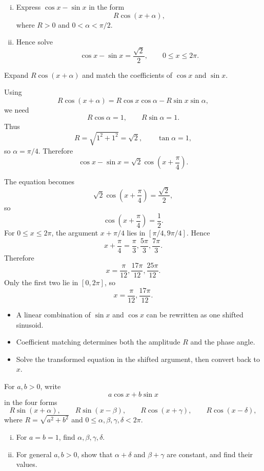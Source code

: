 \begin{problem}
\begin{enumerate}[(i)]
  \item Express $\cos x-\sin x$ in the form
        \[
        R\cos(x+\alpha),
        \]
        where $R>0$ and $0<\alpha<\pi/2$.
  \item Hence solve
        \[
        \cos x-\sin x=\frac{\sqrt2}{2},
        \qquad 0\le x\le2\pi.
        \]
\end{enumerate}
\end{problem}

\begin{hintbox}
Expand $R\cos(x+\alpha)$ and match the coefficients of $\cos x$ and $\sin x$.
\end{hintbox}

\begin{solution}
Using
\[
R\cos(x+\alpha)=R\cos x\cos\alpha-R\sin x\sin\alpha,
\]
we need
\[
R\cos\alpha=1,
\qquad
R\sin\alpha=1.
\]
Thus
\[
R=\sqrt{1^2+1^2}=\sqrt2,
\qquad
\tan\alpha=1,
\]
so $\alpha=\pi/4$. Therefore
\[
\cos x-\sin x=\sqrt2\cos\left(x+\frac{\pi}{4}\right).
\]

The equation becomes
\[
\sqrt2\cos\left(x+\frac{\pi}{4}\right)=\frac{\sqrt2}{2},
\]
so
\[
\cos\left(x+\frac{\pi}{4}\right)=\frac12.
\]
For $0\le x\le2\pi$, the argument $x+\pi/4$ lies in
$[\pi/4,9\pi/4]$. Hence
\[
x+\frac{\pi}{4}=\frac{\pi}{3},\frac{5\pi}{3},\frac{7\pi}{3}.
\]
Therefore
\[
x=\frac{\pi}{12},\frac{17\pi}{12},\frac{25\pi}{12}.
\]
Only the first two lie in $[0,2\pi]$, so
\[
\boxed{x=\frac{\pi}{12},\frac{17\pi}{12}}.
\]
\end{solution}

\begin{takeaways}
\begin{itemize}[leftmargin=*]
  \item A linear combination of $\sin x$ and $\cos x$ can be rewritten as one
        shifted sinusoid.
  \item Coefficient matching determines both the amplitude $R$ and the phase
        angle.
  \item Solve the transformed equation in the shifted argument, then convert
        back to $x$.
\end{itemize}
\end{takeaways}

\begin{problem}
For $a,b>0$, write
\[
a\cos x+b\sin x
\]
in the four forms
\[
R\sin(x+\alpha),\qquad
R\sin(x-\beta),\qquad
R\cos(x+\gamma),\qquad
R\cos(x-\delta),
\]
where $R=\sqrt{a^2+b^2}$ and
$0\le\alpha,\beta,\gamma,\delta<2\pi$.

\begin{enumerate}[(i)]
  \item For $a=b=1$, find $\alpha,\beta,\gamma,\delta$.
  \item For general $a,b>0$, show that $\alpha+\delta$ and $\beta+\gamma$ are
        constant, and find their values.
\end{enumerate}
\end{problem}

